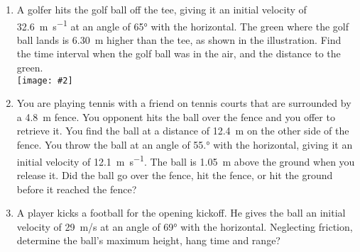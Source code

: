 \documentclass{../../oss-handout}
\newcommand{\pic}[2]{\texttt{[image: \#2]}}
\begin{document}
\begin{enumerate}
\item A golfer hits the golf ball off the tee, giving it an initial velocity of
  \SI{32.6}{\metre\per\second} at an angle of \ang{65} with the horizontal. The
  green where the golf ball lands is \SI{6.30}{\metre} higher than the tee, as
  shown in the illustration. Find the time interval when the golf ball was in
  the air, and the distance to the green.\\
  \pic{.45}{../graphics/golfer.jpg}
  \newpage

\item You are playing tennis with a friend on tennis courts
  that are surrounded by a \SI{4.8}{\metre} fence. You opponent hits the ball
  over the fence and you offer to retrieve it. You find the ball at a distance
  of \SI{12.4}{\metre} on the other side of the fence. You throw the ball at an
  angle of \ang{55.} with the horizontal, giving it an initial velocity of
  \SI{12.1}{\metre\per\second}. The ball is \SI{1.05}{\metre} above the ground
  when you release it. Did the ball go over the fence, hit the fence, or hit
  the ground before it reached the fence?
  
\item A player kicks a football for the opening kickoff. He
  gives the ball an initial velocity of \SI{29}{m/s} at an angle of \ang{69}
  with the horizontal. Neglecting friction, determine the ball's maximum height,
  hang time and range?
\end{enumerate}
\end{document}
